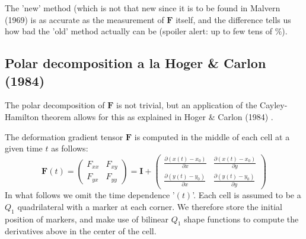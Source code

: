 The 'new' method (which is not that new since it is to be found in Malvern (1969) \cite{malvern} 
is as accurate as the measurement of ${\bm F}$ itself, and the difference tells us how bad 
the 'old' method actually can be (spoiler alert: up to few tens of \%).




 

\newpage
\subsection*{Polar decomposition a la Hoger \& Carlon (1984)}

The polar decomposition of ${\bm F}$ is not trivial, but an 
application of the Cayley-Hamilton theorem allows for this 
as explained in Hoger \& Carlon (1984) \cite{hoca84}.

The deformation gradient tensor ${\bm F}$ is computed in the middle of
each cell at a given time $t$ as follows:
\[
{\bm F}(t)
=
\left(
\begin{array}{cc}
F_{xx} & F_{xy} \\
F_{yx} & F_{yy} 
\end{array}
\right)
=
{\bm I}+
\left(
\begin{array}{cc}
\frac{\partial (x(t)-x_0)}{\partial x}  & \frac{\partial (x(t)-x_0)}{\partial y}  \\
\frac{\partial (y(t)-y_0)}{\partial x}  & \frac{\partial (y(t)-y_0)}{\partial y}  
\end{array}
\right)
\]
In what follows we omit the time dependence '$(t)$'.
Each cell is assumed to be a $Q_1$ quadrilateral with a marker at each corner. We therefore store the 
initial position of markers, and make use of bilinear $Q_1$ shape functions to compute the derivatives
above in the center of the cell.

